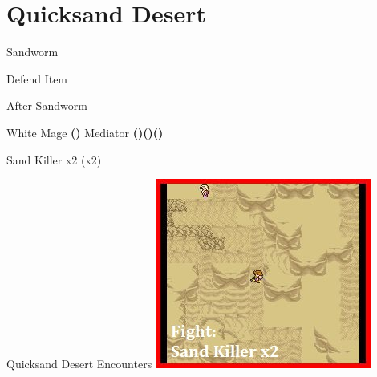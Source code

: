 \chapter{Quicksand Desert}

\vspace{\baselineskip}

\begin{paracol}{2}

\begin{boss}{Sandworm}
    \varwb
    \begin{round}{1}
        \bartz Defend
        \faris Item \then {} \then \leftCommand{\throw} \then \waterScroll
        \lenna \leftCommand{\throw} \then \waterScroll
        \item {}
        \vspace{1mm}
        \item[] 
        \galuf \leftCommand{\throw} \then \waterScroll
    \end{round}
    \varwe
\end{boss}

\switchcolumnTwice[*]
\begin{menu}{After Sandworm}
    \varwb
    \begin{jobMenu}
        \galuf White Mage \textbf{(\pointDown)}
        \lenna Mediator \textbf{(\pointDown)(\pointLeft)(\pointDown)}
    \end{jobMenu}
    \begin{magicMenu}
        \galuf \cure \space \then {}
    \end{magicMenu}
    \varwe
\end{menu}

\begin{encounter}{Sand Killer x2 (x2)}
	\varwb
	\begin{notes}
		\item {}
	\end{notes}
	\begin{round}{1}
		\faris \leftCommand{\throw} \then \waterScroll
	\end{round}
	\varwe
\end{encounter}

\switchcolumn
\newpage
\begin{steproute}{Quicksand Desert Encounters}
    \includegraphics[scale=0.448]{../Graphics/Steps/66. Quicksand Enc 1.jpg}
\end{steproute}


\end{paracol}
